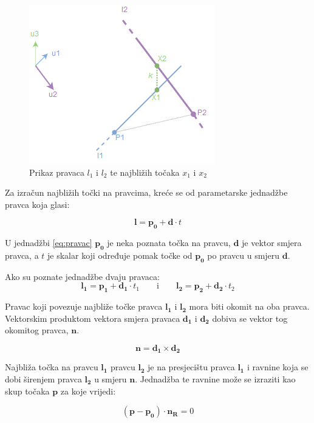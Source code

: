 \documentclass[times, utf8, diplomski]{fer}
\begin{document}
\begin{figure}[h]
\centering
\includegraphics[width=.5\textwidth]{skew-lines}
\caption{Prikaz pravaca $l_1$ i $l_2$ te najbližih točaka $x_1$ i $x_2$}
\label{fig:skew-lines}
\end{figure}

Za izračun najbližih točki na pravcima, kreće se od parametarske jednadžbe pravca koja glasi:

\begin{equation}
\bm{l} = \bm{p_0} + \bm{d}\cdot t
\label{eq:pravac}
\end{equation}

\vspace{5mm}

U jednadžbi \ref{eq:pravac} $\bm{p_0}$ je neka poznata točka na pravcu, $\bm{d}$ je vektor smjera pravca, a $t$ je skalar koji određuje pomak točke od $\bm{p_0}$ po pravcu u smjeru $\bm{d}$.

Ako su poznate jednadžbe dvaju pravaca: 
\begin{equation}
\bm{l_1} = \bm{p_1} + \bm{d_1}\cdot t_1 \qquad\text{i}\qquad \bm{l_2} = \bm{p_2} + \bm{d_2}\cdot t_2
\label{eq:pravci}
\end{equation}

Pravac koji povezuje najbliže točke pravca $\bm{l_1}$ i $\bm{l_2}$ mora biti okomit na oba pravca. Vektorskim produktom vektora smjera pravaca $\bm{d_1}$ i $\bm{d_2}$ dobiva se vektor tog okomitog pravca, $\bm{n}$.

\begin{equation}
\bm{n} = \bm{d_1} \times \bm{d_2}
\end{equation}

Najbliža točka na pravcu $\bm{l_1}$ pravcu $\bm{l_2}$ je na presjecištu pravca $\bm{l_1}$ i ravnine koja se dobi širenjem pravca $\bm{l_2}$ u smjeru $\bm{n}$. Jednadžba te ravnine može se izraziti kao skup točaka $\bm{p}$ za koje vrijedi:

\begin{equation}
(\bm{p} - \bm{p_0})\cdot\bm{n_R} = 0
\label{eq:ravnina}
\end{equation}
\end{document}

